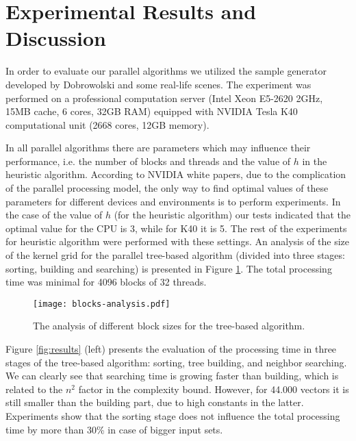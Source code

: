\documentclass[a4paper]{article}
\begin{document}
\section{Experimental Results and Discussion}
\label{sec:experiments}

In order to evaluate our parallel algorithms we utilized the sample generator developed by Dobrowolski \cite{DBLP:conf/sii/Dobrowolski13} and some real-life scenes. The experiment was performed on a professional computation server (Intel Xeon E5-2620 2GHz, 15MB cache, 6 cores, 32GB RAM) equipped with NVIDIA Tesla K40 computational unit (2668 cores, 12GB memory). 

In all parallel algorithms there are parameters which may influence their performance, i.e. the number of blocks and threads and the value of $h$ in the heuristic algorithm. According to NVIDIA white papers, due to the complication of the parallel processing model, the only way to find optimal values of these parameters for different devices and environments is to perform experiments. In the case of the value of $h$ (for the heuristic algorithm) our tests indicated that the optimal value for the CPU is 3, while for K40 it is 5. The rest of the experiments for heuristic algorithm were performed with these settings. An analysis of the size of the kernel grid for the parallel tree-based algorithm (divided into three stages: sorting, building and searching) is presented in Figure \ref{fig:blocks}. The total processing time was minimal for 4096 blocks of 32 threads. 

\begin{figure}[h]
\begin{center}
\texttt{[image: blocks-analysis.pdf]}
\end{center}
\caption{\label{fig:blocks} The analysis of different block sizes for the tree-based algorithm. }
\end{figure}

Figure \ref{fig:results} (left) presents the evaluation of the processing time in three stages of the tree-based algorithm: sorting, tree building, and neighbor searching. We can clearly see that searching time is growing faster than building, which is related to the $n^2$ factor in the complexity bound. However, for 44.000 vectors it is still smaller than the building part, due to high constants in the latter. Experiments show that the sorting stage does not influence the total processing time by more than 30\% in case of bigger input sets. 
\end{document}
